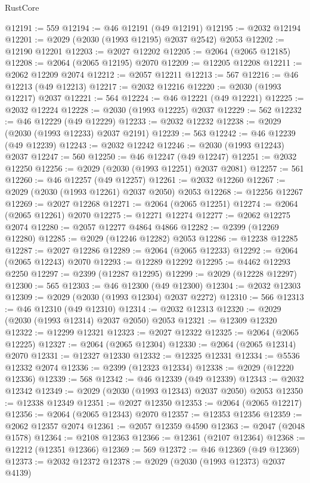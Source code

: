 \begin{lexlean}{RustCore}
\begin{coremodule}
@12191 := 559
@12194 := @46 @12191 (@49 @12191)
@12195 := @2032 @12194
@12201 := @2029 (@2030 (@1993 @12195) @2037 @2542) @2053
@12202 := @12190 @12201
@12203 := @2027 @12202
@12205 := @2064 (@2065 @12185)
@12208 := @2064 (@2065 @12195) @2070
@12209 := @12205 @12208
@12211 := @2062 @12209 @2074
@12212 := @2057 @12211
@12213 := 567
@12216 := @46 @12213 (@49 @12213)
@12217 := @2032 @12216
@12220 := @2030 (@1993 @12217) @2037
@12221 := 564
@12224 := @46 @12221 (@49 @12221)
@12225 := @2032 @12224
@12228 := @2030 (@1993 @12225) @2037
@12229 := 562
@12232 := @46 @12229 (@49 @12229)
@12233 := @2032 @12232
@12238 := @2029 (@2030 (@1993 @12233) @2037 @2191)
@12239 := 563
@12242 := @46 @12239 (@49 @12239)
@12243 := @2032 @12242
@12246 := @2030 (@1993 @12243) @2037
@12247 := 560
@12250 := @46 @12247 (@49 @12247)
@12251 := @2032 @12250
@12256 := @2029 (@2030 (@1993 @12251) @2037 @2081)
@12257 := 561
@12260 := @46 @12257 (@49 @12257)
@12261 := @2032 @12260
@12267 := @2029 (@2030 (@1993 @12261) @2037 @2050) @2053
@12268 := @12256 @12267
@12269 := @2027 @12268
@12271 := @2064 (@2065 @12251)
@12274 := @2064 (@2065 @12261) @2070
@12275 := @12271 @12274
@12277 := @2062 @12275 @2074
@12280 := @2057 @12277 @4864 @4866
@12282 := @2399 (@12269 @12280)
@12285 := @2029 (@12246 @12282) @2053
@12286 := @12238 @12285
@12287 := @2027 @12286
@12289 := @2064 (@2065 @12233)
@12292 := @2064 (@2065 @12243) @2070
@12293 := @12289 @12292
@12295 := @4462 @12293 @2250
@12297 := @2399 (@12287 @12295)
@12299 := @2029 (@12228 @12297)
@12300 := 565
@12303 := @46 @12300 (@49 @12300)
@12304 := @2032 @12303
@12309 := @2029 (@2030 (@1993 @12304) @2037 @2272)
@12310 := 566
@12313 := @46 @12310 (@49 @12310)
@12314 := @2032 @12313
@12320 := @2029 (@2030 (@1993 @12314) @2037 @2050) @2053
@12321 := @12309 @12320
@12322 := @12299 @12321
@12323 := @2027 @12322
@12325 := @2064 (@2065 @12225)
@12327 := @2064 (@2065 @12304)
@12330 := @2064 (@2065 @12314) @2070
@12331 := @12327 @12330
@12332 := @12325 @12331
@12334 := @5536 @12332 @2074
@12336 := @2399 (@12323 @12334)
@12338 := @2029 (@12220 @12336)
@12339 := 568
@12342 := @46 @12339 (@49 @12339)
@12343 := @2032 @12342
@12349 := @2029 (@2030 (@1993 @12343) @2037 @2050) @2053
@12350 := @12338 @12349
@12351 := @2027 @12350
@12353 := @2064 (@2065 @12217)
@12356 := @2064 (@2065 @12343) @2070
@12357 := @12353 @12356
@12359 := @2062 @12357 @2074
@12361 := @2057 @12359 @4590
@12363 := @2047 (@2048 @1578)
@12364 := @2108 @12363
@12366 := @12361 (@2107 @12364)
@12368 := @12212 (@12351 @12366)
@12369 := 569
@12372 := @46 @12369 (@49 @12369)
@12373 := @2032 @12372
@12378 := @2029 (@2030 (@1993 @12373) @2037 @4139)

\end{coremodule}
\end{lexlean}
